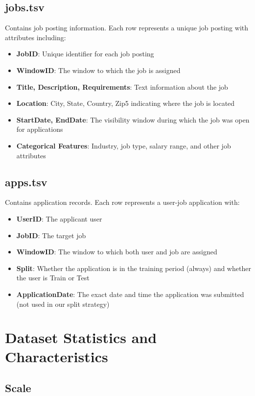 \subsection{jobs.tsv}

Contains job posting information. Each row represents a unique job posting with attributes including:
\begin{itemize}
    \item \textbf{JobID}: Unique identifier for each job posting
    \item \textbf{WindowID}: The window to which the job is assigned
    \item \textbf{Title, Description, Requirements}: Text information about the job
    \item \textbf{Location}: City, State, Country, Zip5 indicating where the job is located
    \item \textbf{StartDate, EndDate}: The visibility window during which the job was open for applications
    \item \textbf{Categorical Features}: Industry, job type, salary range, and other job attributes
\end{itemize}

\subsection{apps.tsv}

Contains application records. Each row represents a user-job application with:
\begin{itemize}
    \item \textbf{UserID}: The applicant user
    \item \textbf{JobID}: The target job
    \item \textbf{WindowID}: The window to which both user and job are assigned
    \item \textbf{Split}: Whether the application is in the training period (always) and whether the user is Train or Test
    \item \textbf{ApplicationDate}: The exact date and time the application was submitted (not used in our split strategy)
\end{itemize}

\section{Dataset Statistics and Characteristics}
\label{sec:dataset_statistics}
\subsection{Scale}
